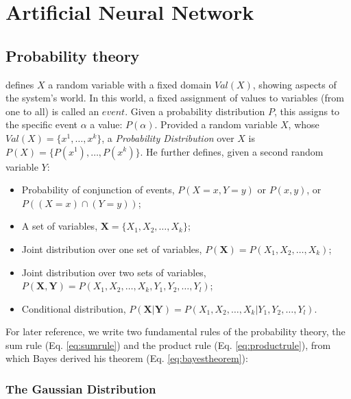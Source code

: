 
\chapter{Artificial Neural Network}
\label{cap:ann}

\section{Probability theory}
\label{sec:probability}

\citet{RefWorks:194} defines $X$ a random variable with a fixed domain $Val(X)$,
showing aspects of the system's world. In this world, a fixed assignment of
values to variables (from one to all) is called an $event$.
Given a probability distribution $P$, this assigns to the specific event
$\alpha$ a value: $P(\alpha)$.
Provided a random variable $X$, whose $Val(X) = \{ x^1, \ldots , x^k \}$, a
\textit{Probability Distribution} over $X$ is $P(X) = \{ P(x^1), \ldots , P(x^k)
\}$.
He further defines, given a second random variable $Y$:
\begin{itemize}
  \item {Probability of conjunction of events, $P(X = x, Y = y)$ or $P(x, y)$,
  or $P((X = x) \cap (Y = y))$;}
  \item {A set of variables, $\mathbf{X} = \{X_1, X_2, \ldots , X_k \}$;}
  \item {Joint distribution over one set of variables, $P(\mathbf{X}) =
  P(X_1, X_2, \ldots , X_k) $;}
  \item {Joint distribution over two sets of variables, $P(\mathbf{X, Y}) =
  P(X_1, X_2, \ldots , X_k, Y_1, Y_2, \ldots , Y_l  ) $;}
  \item {Conditional distribution, $P(\mathbf{X | Y}) =
  P(X_1, X_2, \ldots , X_k | Y_1, Y_2, \ldots , Y_l  ) $.}
\end{itemize}

For later reference, we write two fundamental rules of the probability theory,
the sum rule (Eq. \ref{eq:sumrule}) and the product rule (Eq.
\ref{eq:productrule}), from which Bayes derived his theorem (Eq.
\ref{eq:bayestheorem}):




\subsection{The Gaussian Distribution}
\label{subsec:gaussian}

